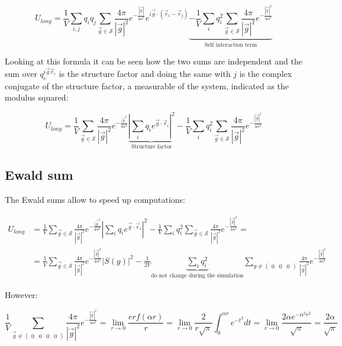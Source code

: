 	$$U_{long} = \frac{1}{V}\sum\limits_{i, j}q_iq_j\sum\limits_{\vec{g}\in\mathcal{S}}\frac{4\pi}{|\vec{g}|^2}e^{-\frac{|\vec{g}|}{4\alpha^2}}e^{i\vec{g}\cdot(\vec{r}_i-\vec{r}_j)}\underbrace{-\frac{1}{V}\sum\limits_iq_i^2\sum\limits_{\vec{g}\in\mathcal{S}}\frac{4\pi}{|\vec{g}|^2}e^{-\frac{|\vec{g}|^2}{4\alpha^2}}}_{\text{Self interaction term}}$$

	Looking at this formula it can be seen how the two sums are independent and the sum over $q_e^{i\vec{g}\vec{r}_i}$ is the structure factor and doing the same with $j$ is the complex conjugate of the structure factor, a measurable of the system, indicated as the modulus squared:

	$$U_{long} = \frac{1}{V}\sum\limits_{\vec{g}\in\mathcal{S}}\frac{4\pi}{|\vec{g}|^2}e^{-\frac{|\vec{g}^2}{4\alpha^2}}\underbrace{|\sum\limits_{i}q_ie^{\vec{g}\cdot\vec{r}_i}|^2}_{\text{Structure factor}} - \frac{1}{V}\sum\limits_iq_i^2\sum\limits_{\vec{g}\in\mathcal{S}}\frac{4\pi}{|\vec{g}|^2}e^{-\frac{|\vec{g}|^2}{4\alpha^2}}$$

	\subsection{Ewald sum}
	The Ewald sums allow to speed up computations:

	\begin{align*}
		U_{long} &= \frac{1}{V}\sum\limits_{\vec{g}\in\mathcal{S}}\frac{4\pi}{|\vec{g}|^2}e^{-\frac{|\vec{g}^2}{4\alpha^2}}|\sum\limits_{i}q_ie^{\vec{g}\cdot\vec{r}_i}|^2 - \frac{1}{V}\sum\limits_iq_i^2\sum\limits_{\vec{g}\in\mathcal{S}}\frac{4\pi}{|\vec{g}|^2}e^{-\frac{|\vec{g}|^2}{4\alpha^2}} = \\
						 &= \frac{1}{V}\sum\limits_{\vec{g}\in\mathcal{S}}\frac{4\pi}{|\vec{g}|^2}e^{-\frac{|\vec{g}|^2}{4\alpha^2}}|S(g)|^2-\frac{1}{2V}\underbrace{\sum\limits_{i}q_i^2}_{\text{do not change during the simulation}}\sum\limits_{g\neq\begin{pmatrix} 0&0&0\end{pmatrix}}\frac{4\pi}{|\vec{g}|^2}e^{-\frac{|\vec{g}|^2}{4\alpha^2}}
	\end{align*}

	However:

	$$\frac{1}{V}\sum\limits_{\vec{g}\neq\begin{pmatrix}0&0&0&0\end{pmatrix}}\frac{4\pi}{|\vec{g}|^2}e^{-\frac{|\vec{g}|^2}{4\alpha^2}} = \lim\limits_{r\rightarrow 0}\frac{erf(\alpha r)}{r} = \lim\limits_{r\rightarrow 0}\frac{2}{r\sqrt{\pi}}\int_0^{\alpha r}e^{-t^2}dt = \lim\limits_{r\rightarrow 0}\frac{2\alpha e^{-\alpha^2r^2}}{\sqrt{\pi}} = \frac{2\alpha}{\sqrt{\pi}}$$

